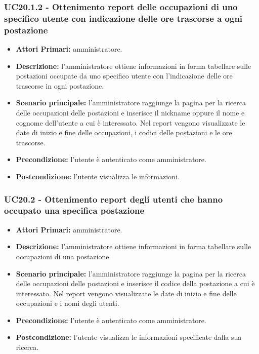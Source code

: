 \subsubsection{ UC20.1.2 - Ottenimento report delle occupazioni di uno specifico utente con indicazione delle ore trascorse a ogni postazione}
\begin{itemize}
	\item\textbf{Attori Primari:} 
	amministratore.
	\item\textbf{Descrizione:} 
	l'amministratore ottiene informazioni in forma tabellare sulle postazioni occupate da uno specifico utente con l'indicazione delle ore trascorse in ogni postazione.
	\item\textbf{Scenario principale:} 
	l'amministratore raggiunge la pagina per la ricerca delle occupazioni delle postazioni e inserisce il nickname oppure il nome e cognome dell'utente a cui è interessato.
	Nel report vengono visualizzate le date di inizio e fine delle occupazioni, i codici delle postazioni e le ore trascorse.
	\item\textbf{Precondizione:} 
	l'utente è autenticato come amministratore.
	\item\textbf{Postcondizione:}
	l'utente visualizza le informazioni.
\end{itemize}

\subsubsection{ UC20.2 - Ottenimento report degli utenti che hanno occupato una specifica postazione}
\begin{itemize}
	\item\textbf{Attori Primari:} 
	amministratore.
	\item\textbf{Descrizione:} 
	l'amministratore ottiene informazioni in forma tabellare sulle occupazioni di una postazione.
	\item\textbf{Scenario principale:} 
	l'amministratore raggiunge la pagina per la ricerca delle occupazioni delle postazioni e inserisce il codice della postazione a cui è interessato.
	Nel report vengono visualizzate le date di inizio e fine delle occupazioni e i nomi degli utenti.
	\item\textbf{Precondizione:} 
	l'utente è autenticato come amministratore.
	\item\textbf{Postcondizione:}
	l'utente visualizza le informazioni specificate dalla sua ricerca.
\end{itemize}

